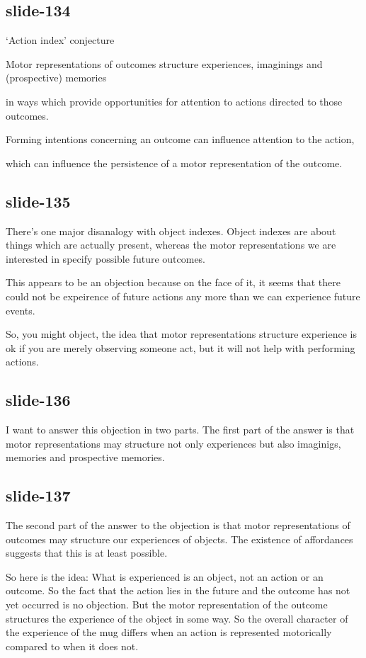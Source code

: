 \documentclass[12pt,\papersize]{extarticle}
\begin{document}
\subsection{slide-134}
‘Action index’ conjecture

Motor representations of outcomes structure 
experiences, imaginings and (prospective) memories

in ways which provide opportunities for attention to actions directed to those outcomes.

Forming intentions concerning an outcome can influence attention to the action,

which can influence the persistence of a motor representation of the outcome.

 
\subsection{slide-135}
There’s one major disanalogy with object indexes.
Object indexes are about things which are actually present, whereas the motor representations
we are interested in specify possible future outcomes.
 
This appears to be an objection because
on the face of it, it seems that there could not be expeirence of future actions
any more than we can experience future events.
 
So, you might object, the idea that motor representations structure experience is ok if you
are merely observing someone act, but it will not help with performing actions.
 
\subsection{slide-136}
I want to answer this objection in two parts.
The first part of the answer is that motor representations may structure not only
experiences but also imaginigs, memories and prospective memories.
 
\subsection{slide-137}
The second part of the answer to the objection is that motor representations of
outcomes may structure our experiences of objects.
The existence of affordances suggests that this is at least possible.
 
So here is the idea:
What is experienced is an object, not an action or an outcome.
So the fact that the action lies in the future and the outcome has not yet occurred is no objection.
But the motor representation of the outcome structures the experience of the object in some way.
So the overall character of the experience of the mug differs when an action is represented
motorically compared to when it does not.
 
\end{document}
